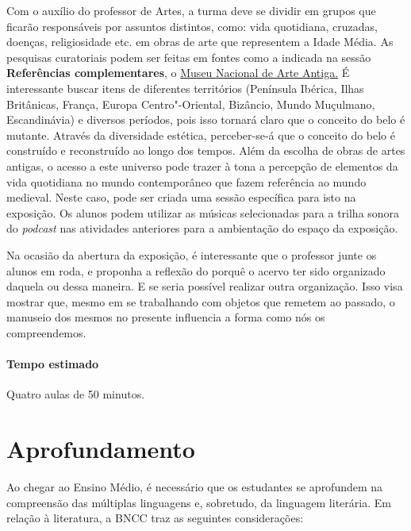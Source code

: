 \documentclass[12pt]{extarticle}
\begin{document}
 		\item
 		Com o auxílio do professor de Artes, a turma deve se dividir em grupos
 		que ficarão responsáveis por assuntos distintos, como: vida quotidiana, 
 		cruzadas, doenças, religiosidade etc. em obras de arte que representem a Idade Média. 
 		As pesquisas curatoriais podem ser feitas em fontes como a indicada na 
 		sessão \textbf{Referências complementares}, o \href{https://artsandculture.google.com/partner/national-museum-of-ancient-art}{Museu Nacional de Arte Antiga.} 
 		É interessante buscar itens de diferentes territórios (Península
		Ibérica, Ilhas Britânicas, França, Europa Centro"-Oriental, Bizâncio,
		Mundo Muçulmano, Escandinávia) e diversos períodos, pois isso tornará
		claro que o conceito do belo é mutante. Através da diversidade estética,
		perceber-se-á que o conceito do belo é construído e reconstruído ao
		longo dos tempos.
		Além da escolha de obras de artes antigas, o acesso a este universo 
		pode trazer à tona a percepção de elementos da vida quotidiana no
		mundo contemporâneo que fazem referência ao mundo medieval. Neste caso,
		pode ser criada uma sessão específica para isto na exposição.
		Os alunos podem utilizar as músicas selecionadas para a trilha sonora 
		do \textit{podcast} nas atividades anteriores para a ambientação do espaço da exposição. 

		Na ocasião da abertura da exposição, é interessante que o professor junte 
		os alunos em roda, e proponha a reflexão do porquê o acervo ter sido organizado 
		daquela ou dessa maneira. E se seria possível realizar outra organização. Isso visa mostrar que,
		mesmo em se trabalhando com objetos que remetem ao passado, o manuseio
		dos mesmos no presente influencia a forma como nós os compreendemos.
 
 \paragraph{Tempo estimado} Quatro aulas de 50 minutos.


\section{Aprofundamento}

Ao chegar ao Ensino Médio, é necessário que os estudantes se aprofundem
na compreensão das múltiplas linguagens e, sobretudo, da linguagem
literária. Em relação à literatura, a BNCC traz as seguintes
considerações:
\end{document}
